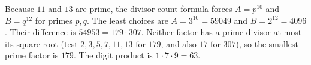 Because $ 11 $ and $ 13 $ are prime, the divisor-count formula forces $ A=p^{10}$ and $ B=q^{12}$ for primes $ p,q $. The least choices are $ A=3^{10}=59049 $ and $ B=2^{12}=4096 $. Their difference is $ 54953=179\cdot307 $. Neither factor has a prime divisor at most its square root (test $ 2,3,5,7,11,13 $ for $ 179 $, and also $ 17 $ for $ 307 $), so the smallest prime factor is $ 179 $. The digit product is $ 1\cdot7\cdot9=\boxed{63}$.
